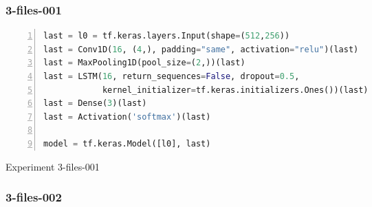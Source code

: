 
\subsubsection{3-files-001}

\noindent
\begin{algorithm}
\begin{lstlisting}[language=Python, frame=single, numbers=left]
last = l0 = tf.keras.layers.Input(shape=(512,256))
last = Conv1D(16, (4,), padding="same", activation="relu")(last)
last = MaxPooling1D(pool_size=(2,))(last)
last = LSTM(16, return_sequences=False, dropout=0.5,
            kernel_initializer=tf.keras.initializers.Ones())(last)
last = Dense(3)(last)
last = Activation('softmax')(last)

model = tf.keras.Model([l0], last)
\end{lstlisting}
\caption{\label{alg:3-files-001}Experiment 3-files-001}
\end{algorithm}

\subsubsection{3-files-002}


